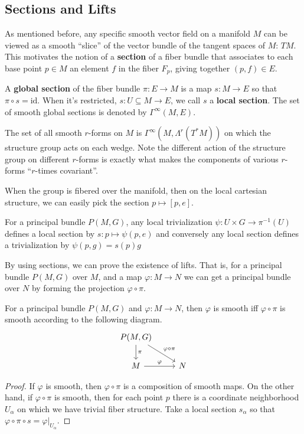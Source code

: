 		
		\subsection{Sections and Lifts}
		
		As mentioned before, any specific smooth vector field on a manifold $M$ can be viewed as a smooth ``slice'' of the vector bundle of the tangent spaces of $M$: $TM$. This motivates the notion of a \textbf{section} of a fiber bundle that associates to each base point $p\in M$ an element $f$ in the fiber $F_p$, giving together $(p,f)\in E$.
		
		A \textbf{global section} of the fiber bundle $\pi: E \rightarrow M$ is a map $s: M \rightarrow E$ so that $\pi \circ s = \text{id}$. When it's restricted, $s: U \subseteq M \rightarrow E$, we call $s$ a \textbf{local section}. The set of smooth global sections is denoted by $\Gamma^\infty (M, E)$. 
		
		\begin{eg}
			The set of all smooth $r$-forms on $M$ is $\Gamma^\infty(M, \Lambda^r (T^* M))$ on which the structure group acts on each wedge. Note the different action of the structure group on different $r$-forms is exactly what makes the components of various $r$-forms ``$r$-times covariant''. 
		\end{eg}
		
		When the group is fibered over the manifold, then on the local cartesian structure, we can easily pick the section $p \mapsto [p,e]$.
		
		\begin{prop}
			For a principal bundle $P(M,G)$, any local trivialization $\psi: U \times G \rightarrow \pi^{-1} (U)$ defines a local section by $s: p \mapsto \psi(p, e)$ and conversely any local section defines a trivialization by $\psi(p,g) = s(p) g$
		\end{prop}
		
		By using sections, we can prove the existence of lifts. That is, for a principal bundle $P(M,G)$ over $M$, and a map $\varphi: M \to N$ we can get a principal bundle over $N$ by forming the projection $\varphi \circ \pi$.
		
		\begin{prop}
			For a principal bundle $P(M,G)$ and $\varphi: M \rightarrow N$, then $\varphi$ is smooth iff $\varphi \circ \pi$ is smooth according to the following diagram.
			\[
			\begin{tikzcd}
				P(M,G) \arrow{d}{\pi} \arrow{rd}{\varphi \circ \pi}\\
				M \arrow{r}{\varphi} & N
			\end{tikzcd}
			\]
		\end{prop}
		\begin{proof}
			If $\varphi$ is smooth, then $\varphi \circ \pi$ is a composition of smooth maps. On the other hand, if $\varphi \circ \pi$ is smooth, then for each point $p$ there is a coordinate neighborhood $U_\alpha$ on which we have trivial fiber structure. Take a local section $s_\alpha$ so that $\varphi \circ \pi \circ s = \varphi|_{U_\alpha}$.
		\end{proof}
		
